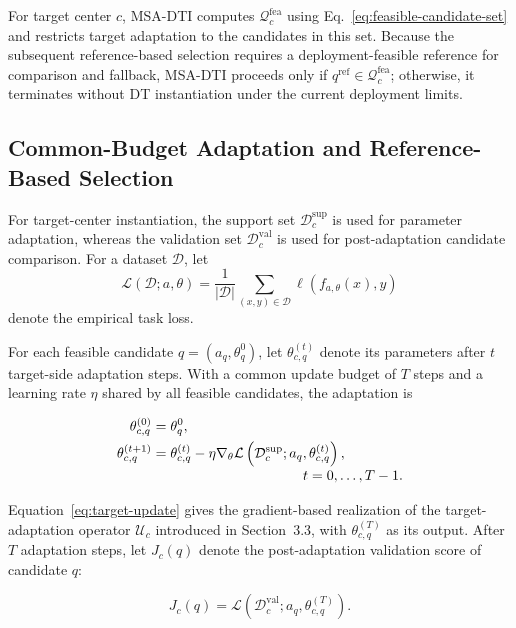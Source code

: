 \documentclass[a4paper,fleqn]{cas-sc}
\begin{document}
For target center $c$, MSA-DTI computes $\mathcal{Q}_c^{\mathrm{fea}}$ using
Eq.~\eqref{eq:feasible-candidate-set} and restricts target adaptation to the
candidates in this set. Because the subsequent reference-based selection
requires a deployment-feasible reference for comparison and fallback, MSA-DTI
proceeds only if $q^{\mathrm{ref}}\in\mathcal{Q}_c^{\mathrm{fea}}$;
otherwise, it terminates without DT instantiation under the current deployment
limits.

\subsection{Common-Budget Adaptation and Reference-Based Selection}

For target-center instantiation, the support set
$\mathcal{D}_c^{\mathrm{sup}}$ is used for parameter adaptation, whereas the
validation set $\mathcal{D}_c^{\mathrm{val}}$ is used for post-adaptation
candidate comparison. For a dataset $\mathcal{D}$, let
\[
\mathcal{L}(\mathcal{D};a,\theta)
=
\frac{1}{|\mathcal{D}|}
\sum_{(x,y)\in\mathcal{D}}
\ell\!\left(f_{a,\theta}(x),y\right)
\]
denote the empirical task loss.

For each feasible candidate $q=(a_q,\theta_q^0)$, let
$\theta_{c,q}^{(t)}$ denote its parameters after $t$ target-side adaptation
steps. With a common update budget of $T$ steps and a learning rate $\eta$
shared by all feasible candidates, the adaptation is

\begin{equation}
\begin{aligned}
\theta_{c,q}^{(0)}
&=
\theta_q^{0},
\\
\theta_{c,q}^{(t+1)}
&=
\theta_{c,q}^{(t)}
-
\eta
\nabla_{\theta}
\mathcal{L}
\left(
\mathcal{D}_{c}^{\mathrm{sup}};
a_q,
\theta_{c,q}^{(t)}
\right),
\\[-1mm]
&\hspace{38mm}
t=0,\ldots,T-1.
\end{aligned}
\label{eq:target-update}
\end{equation}

Equation~\eqref{eq:target-update} gives the gradient-based realization of
the target-adaptation operator $\mathcal{U}_c$ introduced in Section~3.3,
with $\theta_{c,q}^{(T)}$ as its output. After $T$ adaptation steps, let
$J_c(q)$ denote the post-adaptation validation score of candidate $q$:

\begin{equation}
J_c(q)
=
\mathcal{L}
\left(
\mathcal{D}_{c}^{\mathrm{val}};
a_q,
\theta_{c,q}^{(T)}
\right).
\label{eq:validation-loss}
\end{equation}
\end{document}
